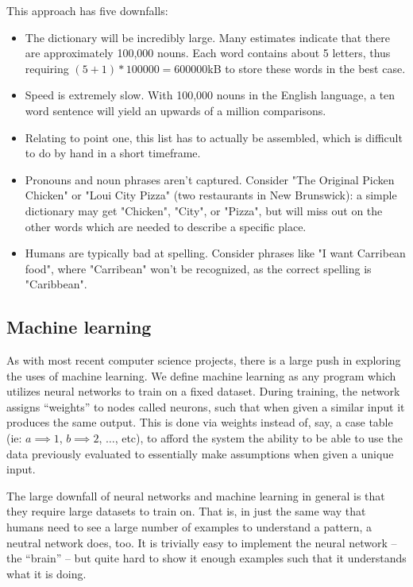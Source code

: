 \documentclass{article}
\begin{document}
        This approach has five downfalls:
        
        \begin{itemize}
            \item The dictionary will be incredibly large. Many estimates indicate that there are approximately 100,000 nouns\cite{howmanywords}. Each word contains about 5 letters\cite{howmanyletters}, thus requiring $(5+1)*100000=600000$kB to store these words in the best case.
            \item Speed is extremely slow. With 100,000\cite{howmanywords} nouns in the English language, a ten word sentence will yield an upwards of a million comparisons.
            \item Relating to point one, this list has to actually be assembled, which is difficult to do by hand in a short timeframe.
            \item Pronouns and noun phrases aren't captured. Consider "The Original Picken Chicken" or "Loui City Pizza" (two restaurants in New Brunswick): a simple dictionary may get "Chicken", "City", or "Pizza", but will miss out on the other words which are needed to describe a specific place.
            \item Humans are typically bad at spelling. Consider phrases like "I want Carribean food", where "Carribean" won't be recognized, as the correct spelling is "Caribbean".
        \end{itemize}
        
    \subsection{Machine learning}
        As with most recent computer science projects, there is a large push in exploring the uses of machine learning. We define machine learning as any program which utilizes neural networks to train on a fixed dataset. During training, the network assigns “weights” to nodes called neurons, such that when given a similar input it produces the same output. This is done via weights instead of, say, a case table (ie: $a \implies 1$, $b \implies 2$, $\ldots$, etc), to afford the system the ability to be able to use the data previously evaluated to essentially make assumptions when given a unique input.

        The large downfall of neural networks and machine learning in general is that they require large datasets to train on. That is, in just the same way that humans need to see a large number of examples to understand a pattern, a neutral network does, too. It is trivially easy to implement the neural network -- the “brain” -- but quite hard to show it enough examples such that it understands what it is doing.
\end{document}
